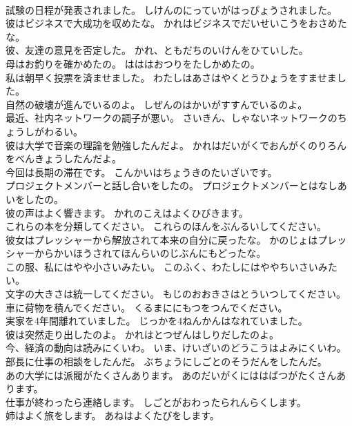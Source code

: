 \documentclass[8pt]{extreport}
\begin{document}
\begin{CJK}{UTF8}{min}
\\	試験の日程が発表されました。	しけんのにっていがはっぴょうされました。 
\\	彼はビジネスで大成功を収めたな。	かれはビジネスでだいせいこうをおさめたな。 
\\	彼、友達の意見を否定した。	かれ、ともだちのいけんをひていした。 
\\	母はお釣りを確かめたの。	はははおつりをたしかめたの。 
\\	私は朝早く投票を済ませました。	わたしはあさはやくとうひょうをすませました。 
\\	自然の破壊が進んでいるのよ。	しぜんのはかいがすすんでいるのよ。 
\\	最近、社内ネットワークの調子が悪い。	さいきん、しゃないネットワークのちょうしがわるい。 
\\	彼は大学で音楽の理論を勉強したんだよ。	かれはだいがくでおんがくのりろんをべんきょうしたんだよ。 
\\	今回は長期の滞在です。	こんかいはちょうきのたいざいです。 
\\	プロジェクトメンバーと話し合いをしたの。	プロジェクトメンバーとはなしあいをしたの。 
\\	彼の声はよく響きます。	かれのこえはよくひびきます。 
\\	これらの本を分類してください。	これらのほんをぶんるいしてください。 
\\	彼女はプレッシャーから解放されて本来の自分に戻ったな。	かのじょはプレッシャーからかいほうされてほんらいのじぶんにもどったな。 
\\	この服、私にはやや小さいみたい。	このふく、わたしにはややちいさいみたい。 
\\	文字の大きさは統一してください。	もじのおおきさはとういつしてください。 
\\	車に荷物を積んでください。	くるまににもつをつんでください。 
\\	実家を4年間離れていました。	じっかを4ねんかんはなれていました。 
\\	彼は突然走り出したのよ。	かれはとつぜんはしりだしたのよ。 
\\	今、経済の動向は読みにくいわ。	いま、けいざいのどうこうはよみにくいわ。 
\\	部長に仕事の相談をしたんだ。	ぶちょうにしごとのそうだんをしたんだ。 
\\	あの大学には派閥がたくさんあります。	あのだいがくにははばつがたくさんあります。 
\\	仕事が終わったら連絡します。	しごとがおわったられんらくします。 
\\	姉はよく旅をします。	あねはよくたびをします。 

\end{CJK}
\end{document}
